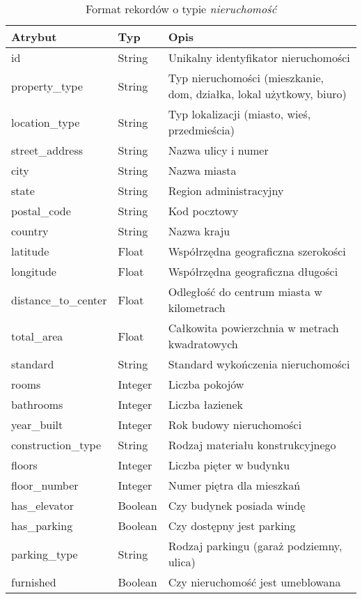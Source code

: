 \begin{table}[H]
    \caption{Format rekordów o typie \textit{nieruchomość}}
    \centering
    \begin{tabular}{|l|l|l|}
    \hline
    \textbf{Atrybut} & \textbf{Typ} & \textbf{Opis} \\
    \hline
    id & String & Unikalny identyfikator nieruchomości \\
    property\_type & String & Typ nieruchomości (mieszkanie, dom, działka, lokal użytkowy, biuro) \\
    location\_type & String & Typ lokalizacji (miasto, wieś, przedmieścia) \\
    street\_address & String & Nazwa ulicy i numer \\
    city & String & Nazwa miasta \\
    state & String & Region administracyjny \\
    postal\_code & String & Kod pocztowy \\
    country & String & Nazwa kraju \\
    latitude & Float & Współrzędna geograficzna szerokości \\
    longitude & Float & Współrzędna geograficzna długości \\
    distance\_to\_center & Float & Odległość do centrum miasta w kilometrach \\
    total\_area & Float & Całkowita powierzchnia w metrach kwadratowych \\
    standard & String & Standard wykończenia nieruchomości \\
    rooms & Integer & Liczba pokojów  \\
    bathrooms & Integer & Liczba łazienek \\
    year\_built & Integer & Rok budowy nieruchomości \\
    construction\_type & String & Rodzaj materiału konstrukcyjnego \\
    floors & Integer & Liczba pięter w budynku \\
    floor\_number & Integer & Numer piętra dla mieszkań \\
    has\_elevator & Boolean & Czy budynek posiada windę \\
    has\_parking & Boolean & Czy dostępny jest parking \\
    parking\_type & String & Rodzaj parkingu (garaż podziemny, ulica) \\
    furnished & Boolean & Czy nieruchomość jest umeblowana \\

\end{tabular}
\end{table}
